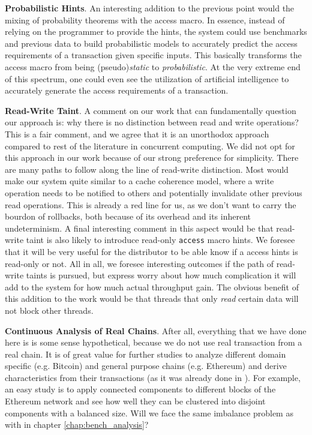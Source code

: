 \textbf{Probabilistic Hints}. An interesting addition to the previous point would the mixing of
probability theorems with the access macro. In essence, instead of relying on the programmer to
provide the hints, the system could use benchmarks and previous data to build probabilistic models
to accurately predict the access requirements of a transaction given specific inputs.  This
basically transforms the access macro from being (pseudo)\textit{static} to \textit{probabilistic}.
At the very extreme end of this spectrum, one could even see the utilization of artificial
intelligence to accurately generate the access requirements of a transaction.

\textbf{Read-Write Taint}. A comment on our work that can fundamentally question our approach is:
why there is no distinction between read and write operations? This is a fair comment, and we agree
that it is an unorthodox approach compared to rest of the literature in concurrent computing. We did
not opt for this approach in our work because of our strong preference for simplicity. There are
many paths to follow along the line of read-write distinction. Most would make our system quite
similar to a cache coherence model, where a write operation needs to be notified to others and
potentially invalidate other previous read operations. This is already a red line for us, as we
don't want to carry the bourdon of rollbacks, both because of its overhead and its inherent
undeterminism. A final interesting comment in this aspect would be that read-write taint is also
likely to introduce read-only \texttt{access} macro hints. We foresee that it will be very useful
for the distributor to be able know if a access hints is read-only or not. All in all, we foresee
interesting outcomes if the path of read-write taints is pursued, but express worry about how much
complication it will add to the system for how much actual throughput gain. The obvious benefit of
this addition to the work would be that threads that only \textit{read} certain data will not block
other threads.

\textbf{Continuous Analysis of Real Chains}. After all, everything that we have done here is is some
sense hypothetical, because we do not use real transaction from a real chain. It is of great value
for further studies to analyze different domain specific (e.g. Bitcoin) and general purpose chains
(e.g. Ethereum) and derive characteristics from their transactions (as it was already done in
\cite{saraphEmpiricalStudySpeculative2019}). For example, an easy study is to apply connected
components to different blocks of the Ethereum network and see how well they can be clustered into
disjoint components with a balanced size. Will we face the same imbalance problem as with in chapter
\ref{chap:bench_analysis}?

